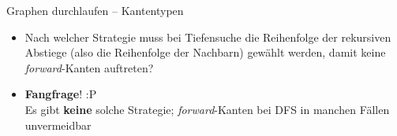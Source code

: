 \begin{frame}{Graphen durchlaufen – Kantentypen}
	\begin{itemize}
		\item Nach welcher Strategie muss bei Tiefensuche die Reihenfolge der rekursiven Abstiege (also die Reihenfolge der Nachbarn) gewählt werden, damit keine \textit{forward}-Kanten auftreten?
		\pause
		\item \textbf{Fangfrage}! :P \\
		Es gibt \textbf{keine} solche Strategie; \emph{forward}-Kanten bei DFS in manchen Fällen unvermeidbar
	\end{itemize}
\end{frame}	



